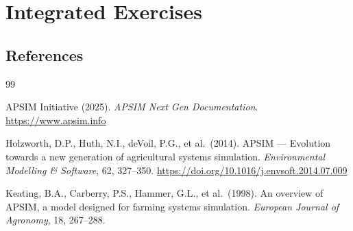 \appendix

\part*{Integrated Exercises}















\backmatter


\chapter{References}

\begin{thebibliography}{99}

  APSIM Initiative (2025). \textit{APSIM Next Gen Documentation}.
  \url{https://www.apsim.info}

  Holzworth, D.P., Huth, N.I., deVoil, P.G., et al.\ (2014).
  APSIM --- Evolution towards a new generation of agricultural systems simulation.
  \textit{Environmental Modelling \& Software}, 62, 327--350.
  \url{https://doi.org/10.1016/j.envsoft.2014.07.009}

  Keating, B.A., Carberry, P.S., Hammer, G.L., et al.\ (1998).
  An overview of APSIM, a model designed for farming systems simulation.
  \textit{European Journal of Agronomy}, 18, 267--288.

\end{thebibliography}

